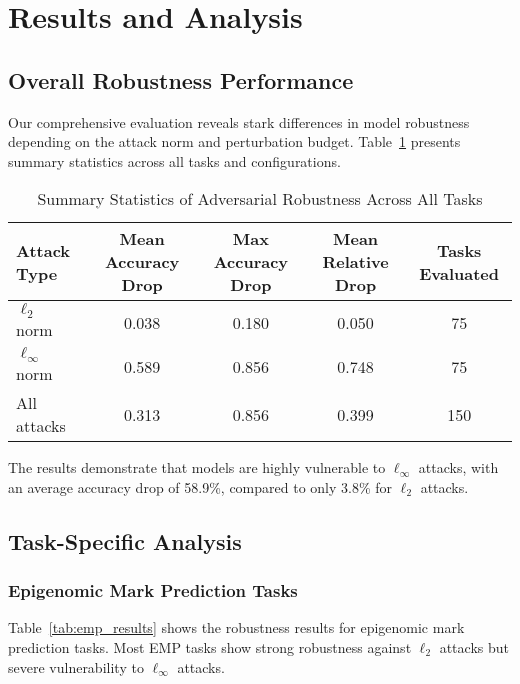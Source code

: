 \documentclass{article} %
\begin{document}
\section{Results and Analysis}

\subsection{Overall Robustness Performance}

Our comprehensive evaluation reveals stark differences in model robustness depending on the attack norm and perturbation budget. Table~\ref{tab:summary_stats} presents summary statistics across all tasks and configurations.

\begin{table}[h]
\centering
\caption{Summary Statistics of Adversarial Robustness Across All Tasks}
\label{tab:summary_stats}
\begin{tabular}{lcccc}
\toprule
\textbf{Attack Type} & \textbf{Mean Accuracy Drop} & \textbf{Max Accuracy Drop} & \textbf{Mean Relative Drop} & \textbf{Tasks Evaluated} \\
\midrule
$\ell_2$ norm & 0.038 & 0.180 & 0.050 & 75 \\
$\ell_\infty$ norm & 0.589 & 0.856 & 0.748 & 75 \\
\midrule
All attacks & 0.313 & 0.856 & 0.399 & 150 \\
\bottomrule
\end{tabular}
\end{table}

The results demonstrate that models are highly vulnerable to $\ell_\infty$ attacks, with an average accuracy drop of 58.9\%, compared to only 3.8\% for $\ell_2$ attacks.

\subsection{Task-Specific Analysis}

\subsubsection{Epigenomic Mark Prediction Tasks}

Table~\ref{tab:emp_results} shows the robustness results for epigenomic mark prediction tasks. Most EMP tasks show strong robustness against $\ell_2$ attacks but severe vulnerability to $\ell_\infty$ attacks.
\end{document}
